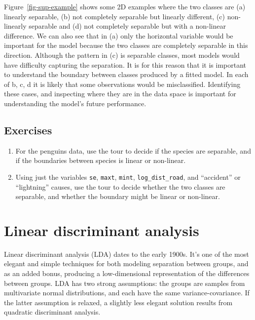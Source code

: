 \documentclass[
  letterpaper,
]{krantz}
\providecommand{\tightlist}{%
  \setlength{\itemsep}{0pt}\setlength{\parskip}{0pt}}\usepackage{longtable,booktabs,array}
\begin{document}
Figure~\ref{fig-sup-example} shows some 2D examples where the two
classes are (a) linearly separable, (b) not completely separable but
linearly different, (c) non-linearly separable and (d) not completely
separable but with a non-linear difference. We can also see that in (a)
only the horizontal variable would be important for the model because
the two classes are completely separable in this direction. Although the
pattern in (c) is separable classes, most models would have difficulty
capturing the separation. It is for this reason that it is important to
understand the boundary between classes produced by a fitted model. In
each of b, c, d it is likely that some observations would be
misclassified. Identifying these cases, and inspecting where they are in
the data space is important for understanding the model's future
performance.

\section*{Exercises}\label{exercises-12}


\begin{enumerate}
\def\labelenumi{\arabic{enumi}.}
\tightlist
\item
  For the penguins data, use the tour to decide if the species are
  separable, and if the boundaries between species is linear or
  non-linear.
\item
  Using just the variables \texttt{se}, \texttt{maxt}, \texttt{mint},
  \texttt{log\_dist\_road}, and ``accident'' or ``lightning'' causes,
  use the tour to decide whether the two classes are separable, and
  whether the boundary might be linear or non-linear.
\end{enumerate}


\chapter{Linear discriminant analysis}\label{sec-lda}


Linear discriminant analysis (LDA) dates to the early 1900s. It's one of
the most elegant and simple techniques for both modeling separation
between groups, and as an added bonus, producing a low-dimensional
representation of the differences between groups. LDA has two strong
assumptions: the groups are samples from multivariate normal
distributions, and each have the same variance-covariance. If the latter
assumption is relaxed, a slightly less elegant solution results from
quadratic discriminant analysis.
\end{document}
